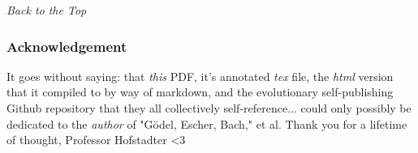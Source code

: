 \documentclass[runningheads]{llncs}
\begin{document}
\emph{Back to the Top}

\subsubsection*{Acknowledgement} 
It goes without saying: that \emph{this} PDF, it's annotated \emph{tex} file, the \emph{html} version that it compiled to by way of markdown, and the evolutionary self-publishing Github repository that they all collectively self-reference... could only possibly be dedicated to the \emph{author} of "Gödel, Escher, Bach," et al. Thank you for a lifetime of thought, Professor Hofstadter <3 
\end{document}
